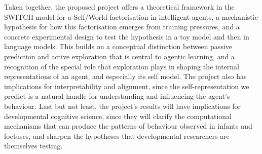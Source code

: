 \documentclass[11pt]{article}
\begin{document}
Taken together, the proposed project offers a theoretical framework in the SWITCH model for a Self/World factorisation in intelligent agents, a mechanistic hypothesis for how this factorisation emerges from training pressures, and a concrete experimental design to test the hypothesis in a toy model and then in language models. This builds on a conceptual distinction between passive prediction and active exploration that is central to agentic learning, and a recognition of the special role that exploration plays in shaping the internal representations of an agent, and especially its self model. The project also has implications for interpretability and alignment, since the self-representation we predict is a natural handle for understanding and influencing the agent's behaviour. Last but not least, the project's results will have implications for developmental cognitive science, since they will clarify the computational mechanisms that can produce the patterns of behaviour observed in infants and foetuses, and sharpen the hypotheses that developmental researchers are themselves testing. 


\end{document}

